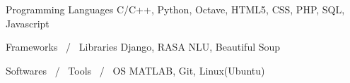 

\begin{cvskills}

  \cvskill
    {Programming Languages} %
    {C/C++, Python, Octave, HTML5, CSS, PHP, SQL, Javascript} %


  \cvskill
    {Frameworks \, / \, Libraries} %
    {Django, RASA NLU, Beautiful Soup} %

\cvskill
    {Softwares \, / \, Tools \, / \, OS} %
    {MATLAB, Git, Linux(Ubuntu)} %

\end{cvskills}

